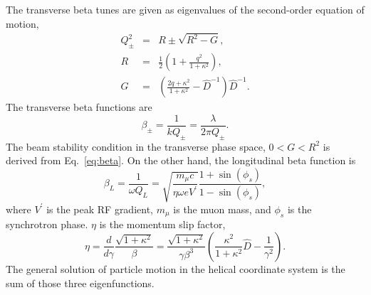 \documentclass[11pt]{article}
\begin{document}
The transverse beta tunes are given as eigenvalues of the second-order equation of motion, 
\begin{eqnarray}
    Q^2_{\pm}&=&R\pm \sqrt{R^2-G}, \label{eq:beta} \\
    R&=&\frac{1}{2}\left(1+\frac{q^2}{1+\kappa^2} \right), \\
    G&=&\left( \frac{2q+\kappa^2}{1+\kappa^2}-\hat{D}^{-1} \right) \hat{D}^{-1}.
\end{eqnarray}
The transverse beta functions are 
\begin{equation}
    \beta_{\pm} =\frac{1}{kQ_{\pm}}=\frac{\lambda}{2\pi Q_{\pm}}.
    \label{eq:betaT}
\end{equation}
The beam stability condition in the transverse phase space, $0 < G < R^2$ is derived from Eq.~\eqref{eq:beta}. 
On the other hand, the longitudinal beta function is 
\begin{equation}
    \beta_L = \frac{1}{\omega Q_L} = \sqrt{\frac{m_\mu c}{\eta \omega e V^{\prime}}} 
    \frac{1+\sin (\phi_s)}{1-\sin(\phi_s)},
    \label{eq:betaL}
\end{equation}
where $V^{\prime}$ is the peak RF gradient, $m_{\mu}$ is the muon mass, and $\phi_s$ is the synchrotron phase. $\eta$ is the momentum slip factor, 
\begin{equation}
    \eta =\frac{d}{d\gamma} \frac{\sqrt{1+\kappa^2}}{\beta} =\frac{\sqrt{1+\kappa^2}}{\gamma\beta^3} 
    \left( \frac{\kappa^2}{1+\kappa^2}\hat{D} -\frac{1}{\gamma^2} \right).
\end{equation}
The general solution of particle motion in the helical coordinate system is the sum of those three eigenfunctions.
\end{document}
